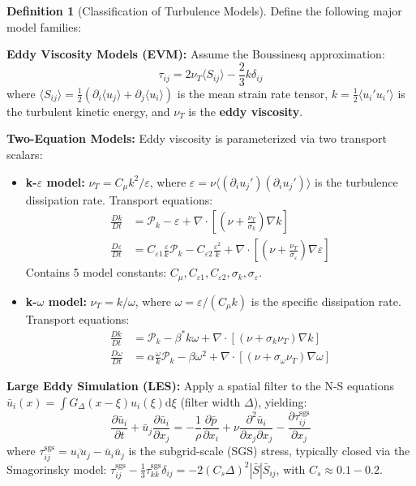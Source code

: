 \documentclass[12pt,a4paper]{article}
\theoremstyle{plain}
\theoremstyle{definition}
\newtheorem{definition}[theorem]{Definition}
\theoremstyle{remark}
\newcommand{\eps}{\varepsilon}
\newcommand{\diff}{\mathrm{d}}
\newcommand{\pdiff}{\partial}
\newcommand{\Div}{\nabla\cdot}
\newcommand{\Grad}{\nabla}
\newcommand{\avg}[1]{\langle #1 \rangle}
\begin{document}
\begin{definition}[Classification of Turbulence Models]
Define the following major model families:

\textbf{Eddy Viscosity Models (EVM):} Assume the Boussinesq approximation:
\begin{equation}
\tau_{ij} = 2\nu_T \avg{S_{ij}} - \frac{2}{3}k\delta_{ij}
\label{eq:boussinesq}
\end{equation}
where $\avg{S_{ij}} = \frac{1}{2}(\pdiff_i\avg{u_j} + \pdiff_j\avg{u_i})$ is the mean strain rate tensor, $k = \frac{1}{2}\avg{u_i' u_i'}$ is the turbulent kinetic energy, and $\nu_T$ is the \textbf{eddy viscosity}.

\textbf{Two-Equation Models:} Eddy viscosity is parameterized via two transport scalars:
\begin{itemize}
    \item \textbf{k-$\eps$ model:} $\nu_T = C_\mu k^2/\eps$, where $\eps = \nu\avg{(\pdiff_i u_j')(\pdiff_i u_j')}$ is the turbulence dissipation rate. Transport equations:
    \begin{align}
        \frac{Dk}{Dt} &= \mathcal{P}_k - \eps + \Div\left[\left(\nu + \frac{\nu_T}{\sigma_k}\right)\Grad k\right] \label{eq:k_eq}\\
        \frac{D\eps}{Dt} &= C_{\eps1}\frac{\eps}{k}\mathcal{P}_k - C_{\eps2}\frac{\eps^2}{k} + \Div\left[\left(\nu + \frac{\nu_T}{\sigma_\eps}\right)\Grad \eps\right] \label{eq:eps_eq}
    \end{align}
    Contains 5 model constants: $C_\mu, C_{\eps1}, C_{\eps2}, \sigma_k, \sigma_\eps$.
    
    \item \textbf{k-$\omega$ model:} $\nu_T = k/\omega$, where $\omega = \eps/(C_\mu k)$ is the specific dissipation rate. Transport equations:
    \begin{align}
        \frac{Dk}{Dt} &= \mathcal{P}_k - \beta^* k\omega + \Div[(\nu + \sigma_k\nu_T)\Grad k] \\
        \frac{D\omega}{Dt} &= \alpha\frac{\omega}{k}\mathcal{P}_k - \beta\omega^2 + \Div[(\nu + \sigma_\omega\nu_T)\Grad \omega]
    \end{align}
\end{itemize}

\textbf{Large Eddy Simulation (LES):} Apply a spatial filter to the N-S equations $\bar{u}_i(x) = \int G_\Delta(x-\xi)u_i(\xi)\diff\xi$ (filter width $\Delta$), yielding:
\begin{equation}
\frac{\pdiff \bar{u}_i}{\pdiff t} + \bar{u}_j\frac{\pdiff \bar{u}_i}{\pdiff x_j} = -\frac{1}{\rho}\frac{\pdiff \bar{p}}{\pdiff x_i} + \nu\frac{\pdiff^2 \bar{u}_i}{\pdiff x_j\pdiff x_j} - \frac{\pdiff \tau_{ij}^{\text{sgs}}}{\pdiff x_j}
\end{equation}
where $\tau_{ij}^{\text{sgs}} = \overline{u_i u_j} - \bar{u}_i\bar{u}_j$ is the subgrid-scale (SGS) stress, typically closed via the Smagorinsky model: $\tau_{ij}^{\text{sgs}} - \frac{1}{3}\tau_{kk}^{\text{sgs}}\delta_{ij} = -2(C_s\Delta)^2|\bar{S}|\bar{S}_{ij}$, with $C_s\approx0.1-0.2$.


\end{definition}
\end{document}
